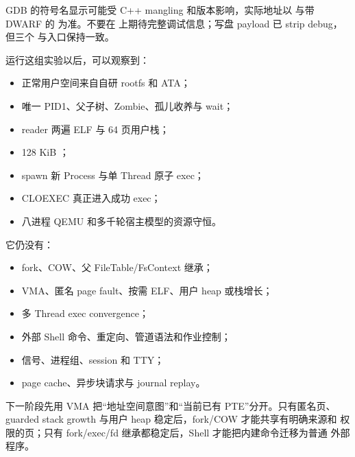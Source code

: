 GDB 的符号名显示可能受 C++ mangling 和版本影响，实际地址以
 与带 DWARF 的  为准。不要在
 上期待完整调试信息；写盘 payload 已 strip
debug，但三个  与入口保持一致。

运行这组实验以后，可以观察到：

\begin{itemize}
  \item 正常用户空间来自自研 rootfs 和 ATA；
  \item 唯一 PID1、父子树、Zombie、孤儿收养与 wait；
  \item reader 两遍 ELF 与 64 页用户栈；
  \item 128 KiB ；
  \item spawn 新 Process 与单 Thread 原子 exec；
  \item CLOEXEC 真正进入成功 exec；
  \item 八进程 QEMU 和多千轮宿主模型的资源守恒。
\end{itemize}

它仍没有：

\begin{itemize}
  \item fork、COW、父 FileTable/FsContext 继承；
  \item VMA、匿名 page fault、按需 ELF、用户 heap 或栈增长；
  \item 多 Thread exec convergence；
  \item 外部 Shell 命令、重定向、管道语法和作业控制；
  \item 信号、进程组、session 和 TTY；
  \item page cache、异步块请求与 journal replay。
\end{itemize}

下一阶段先用 VMA 把“地址空间意图”和“当前已有 PTE”分开。只有匿名页、
guarded stack growth 与用户 heap 稳定后，fork/COW 才能共享有明确来源和
权限的页；只有 fork/exec/fd 继承都稳定后，Shell 才能把内建命令迁移为普通
外部程序。
